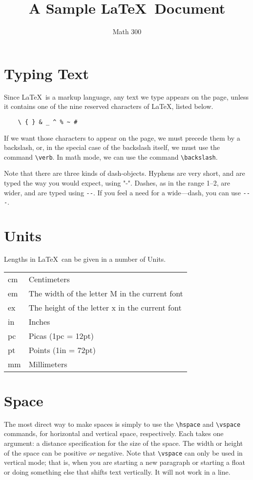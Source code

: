 \documentclass[12pt]{article}
\title{A Sample \LaTeX\ Document}
\author{Math 300}
\begin{document}
\maketitle

\section{Typing Text}
Since \LaTeX\ is a markup language, any text we
type appears on the page, unless it contains
one of the nine reserved characters of \LaTeX, listed
below.
\begin{verbatim}
    \ { } & _ ^ % ~ #
\end{verbatim}
If we want those characters to appear on the page, we
must precede them by a backslash, or, in the special
case of the backslash itself, we must use the 
command \verb(\verb(.
In math mode, we can use the command
\verb(\backslash(.

Note that there are three kinds of dash-objects.
Hyphens
are very short, and are typed the way you would expect, using
"-".
Dashes, as in the range 1--2, are wider, and are typed
using \verb+--+.
If you feel a need for a wide---dash, you can
use \verb+---+.

\section{Units}
Lengths in \LaTeX\ can be given in a number of Units.
\\
\begin{tabular}{ll}
    cm & Centimeters\\
    em & The width of the letter M in the current font\\
    ex & The height of the letter x in the current font\\
    in & Inches\\
    pc & Picas (1pc = 12pt)\\
    pt & Points (1in = 72pt)\\
    mm & Millimeters
\end{tabular}


\section{Space}
The most direct way to make spaces is simply to use the %
\verb(\hspace( and \verb(\vspace( commands, for horizontal
and vertical space, respectively.
Each takes one
argument: a distance specification for the size of the space.
The width or height of the space can be positive {\em or}
negative.
Note that \verb(\vspace( can only be used in 
vertical mode; that is, when you are starting a new paragraph
or starting a float or doing something else that shifts text
vertically.
It will not work in a line.
\end{document}
